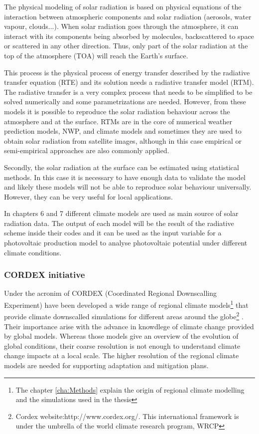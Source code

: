 The physical modeling of solar radiation is based on physical equations of the interaction between atmospheric components and solar radiation (aerosols, water vapour, clouds...). When solar radiation goes through the atmosphere, it can interact with its components being absorbed by molecules, backscattered to space or scattered in any other direction. Thus, only part of the solar radiation at the top of the atmosphere (TOA) will reach the Earth's surface.

This process is the physical process of energy transfer described by the radiative transfer equation (RTE) and its solution needs a radiative transfer model (RTM). The radiative transfer is a very complex process that needs to be simplified to be solved numerically and some parametrizations are needed. However, from these models it is possible to reproduce the solar radiation behaviour across the atmosphere and at the surface. RTMs are in the core of numerical weather prediction models, NWP, and climate models and sometimes they are used to obtain solar radiation from satellite images, although in this case empirical or semi-empirical approaches are also commonly applied.

Secondly, the solar radiation at the surface can be estimated using statistical methods. In this case it is necessary to have enough data to validate the model and likely these models will not be able to reproduce solar behaviour universally. However, they can be very useful for local applications.

In chapters 6 and 7 different climate models are used as main source of solar radiation data. The output of each model will be the result of the radiative scheme inside their codes and it can be used as the input variable for a photovoltaic production model to analyse photovoltaic potential under different climate conditions.

\subsubsection{CORDEX initiative}

Under the acronim of CORDEX (Coordinated Regional Downscalling Experiment) have been developed a wide range of regional climate models\footnote{The chapter \ref{cha:Methods} explain the origin of regional climate modelling and the simulations used in the thesis} that provide climate downscalled simulations for different areas around the globe\footnote{Cordex website:http://www.cordex.org/. This international framework is under the umbrella of the world climate research program, WRCP} . Their importance arise with the advance in knowdlege of climate change provided by global models. Whereas those models give an overview of the evolution of global conditions, their coarse resolution is not enough to understand climate change impacts at a local scale. The higher resolution of the regional climate models are needed for supporting adaptation and mitigation plans.

